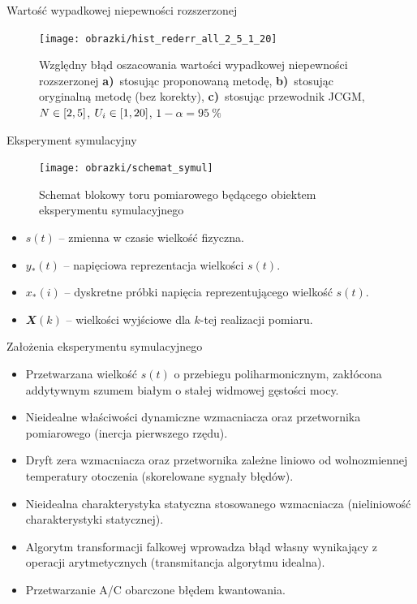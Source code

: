 \documentclass[12pt, polish, aspectratio = 169]{slides}
\begin{document}
\begin{frame}{Wartość wypadkowej niepewności rozszerzonej}
\begin{figure}
\texttt{[image: obrazki/hist\_rederr\_all\_2\_5\_1\_20]}
\caption{Względny błąd oszacowania wartości wypadkowej niepewności rozszerzonej \textbf{a)}~stosując proponowaną metodę, \textbf{b)}~stosując oryginalną metodę (bez korekty), \textbf{c)}~stosując przewodnik JCGM, $N \in \interval{2}{5}$, $U_{i} \in \interval{1}{20}$, $1-\alpha = \qty{95}{\percent}$}
\end{figure}
\end{frame}

\begin{frame}{Eksperyment symulacyjny}
\begin{figure}
\texttt{[image: obrazki/schemat\_symul]}
\caption{Schemat blokowy toru pomiarowego będącego obiektem eksperymentu symulacyjnego}
\end{figure}
\begin{itemize}
\item $s(t)$ -- zmienna w czasie wielkość fizyczna.
\item $y_{*}(t)$ -- napięciowa reprezentacja wielkości $s(t)$.
\item $x_{*}(i)$ -- dyskretne próbki napięcia reprezentującego wielkość $s(t)$.
\item $\mathbfit{X}(k)$ -- wielkości wyjściowe dla $k$-tej realizacji pomiaru.
\end{itemize}
\end{frame}

\begin{frame}{Założenia eksperymentu symulacyjnego}
\begin{itemize}
\item Przetwarzana wielkość $s(t)$ o przebiegu poliharmonicznym, zakłócona addytywnym szumem białym o stałej widmowej gęstości mocy.
\item Nieidealne właściwości dynamiczne wzmacniacza oraz przetwornika pomiarowego (inercja pierwszego rzędu).
\item Dryft zera wzmacniacza oraz przetwornika zależne liniowo od wolnozmiennej temperatury otoczenia (skorelowane sygnały błędów).
\item Nieidealna charakterystyka statyczna stosowanego wzmacniacza (nieliniowość charakterystyki statycznej).
\item Algorytm transformacji falkowej wprowadza błąd własny wynikający z operacji arytmetycznych (transmitancja algorytmu idealna).
\item Przetwarzanie A/C obarczone błędem kwantowania.
\end{itemize}
\end{frame}
\end{document}
